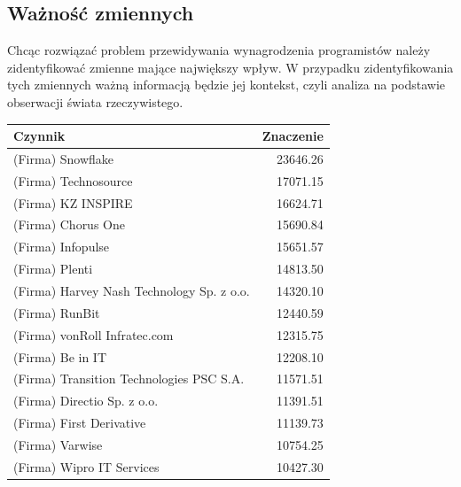 \documentclass{article}
\begin{document}
\subsection{Ważność zmiennych}

Chcąc rozwiązać problem przewidywania wynagrodzenia programistów należy zidentyfikować zmienne mające
największy wpływ. W przypadku zidentyfikowania tych zmiennych ważną informacją będzie jej kontekst,
czyli analiza na podstawie obserwacji świata rzeczywistego.

\begin{table}[H]
    \centering
    \begin{tabular}{|l|r|}
        \hline
        \textbf{Czynnik}                          & \textbf{Znaczenie} \\ \hline
        (Firma) Snowflake                         & 23646.26           \\ \hline
        (Firma) Technosource                      & 17071.15           \\ \hline
        (Firma) KZ INSPIRE                        & 16624.71           \\ \hline
        (Firma) Chorus One                        & 15690.84           \\ \hline
        (Firma) Infopulse                         & 15651.57           \\ \hline
        (Firma) Plenti                            & 14813.50           \\ \hline
        (Firma) Harvey Nash Technology Sp. z o.o. & 14320.10           \\ \hline
        (Firma) RunBit                            & 12440.59           \\ \hline
        (Firma) vonRoll Infratec.com              & 12315.75           \\ \hline
        (Firma) Be in IT                          & 12208.10           \\ \hline
        (Firma) Transition Technologies PSC S.A.  & 11571.51           \\ \hline
        (Firma) Directio Sp. z o.o.               & 11391.51           \\ \hline
        (Firma) First Derivative                  & 11139.73           \\ \hline
        (Firma) Varwise                           & 10754.25           \\ \hline
        (Firma) Wipro IT Services                 & 10427.30           \\ \hline

\end{tabular}
\end{table}
\end{document}
